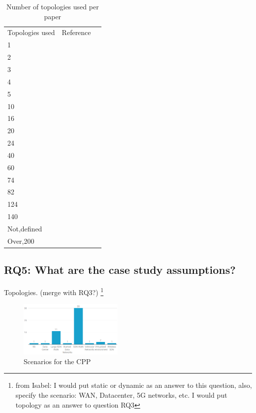 \documentclass{IEEEtran}
\newcommand\fia[1]{{\color{red}\footnote{\color{red}from Isabel: #1}}} %
\begin{document}
\begin{table}[!h]
  \centering
\begin{tabular}{l p{3.2cm} p{3.6cm} }
Topologies used & Reference \\
1 & \cite{AhJa15,RaRe14,WaZh17,HuJo15,SaHi17,XiQu14,LiYo16,SuMa18,ZhGi17,MaJe18,VoBo15,ZhWu17} \\
2 & \cite{BaRo13,WoLi15,FaXi18,AlAy17,YaHo15,HeBa17} \\
3 & \cite{HuWa12,MuOl14,MaDu16,KiRa16,SaSa16} \\
4 & \cite{HuLu17,ZhBe11,KiRe18} \\
5 & \cite{ViMa16} \\
10 & \cite{HuLu16} \\
16 & \cite{AbMa17} \\
20 & \cite{SaSa17} \\
24 & \cite{PeRe16} \\
40 & \cite{VaMo18} \\
60 & \cite{LaGe15,LaGeB15} \\
74 & \cite{ChWa15} \\
82 & \cite{YaBi14} \\
124 & \cite{RoRu14} \\
140 & \cite{HoHa13} \\
Not,defined & \cite{LiWa15,KsBa16,LiJia16,GaWa15,KsBa16b,VaPo17,GoGi17} \\
Over,200 & \cite{HeSh12,JiCe14,SuHa17}
\end{tabular}
\caption{Number of topologies used per paper}
    \label{tab:topologies}
\end{table}


\subsection{RQ5: What are the case study assumptions?}
Topologies. (merge with RQ3?)
\fia{I would put static or dynamic as an answer to this question, also, specify the scenario: WAN, Datacenter, 5G networks, etc. I would put topology as an answer to question RQ3}

\begin{figure}
    \centering
    \includegraphics[width=0.45\textwidth]{Pictures/scenario2.png}
    \caption{Scenarios for the CPP}
    \label{fig:Scenarios1}
\end{figure}
\end{document}

